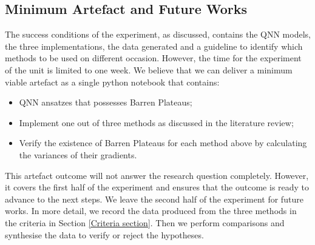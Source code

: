 \subsection{Minimum Artefact and Future Works}

The success conditions of the experiment, as discussed, contains the QNN models, the three implementations, the data generated and a guideline to identify which methods to be used on different occasion.
However, the time for the experiment of the unit is limited to one week. We believe that we can deliver a minimum viable artefact as a single python notebook that contains:
\begin{itemize}
    \item QNN ansatzes that possesses Barren Plateaus;
    \item Implement one out of three methods as discussed in the literature review;
    \item Verify the existence of Barren Plateaus for each method above by calculating the variances of their gradients.
\end{itemize}

This artefact outcome will not answer the research question completely.
However, it covers the first half of the experiment and ensures that the outcome is ready to advance to the next steps.
We leave the second half of the experiment for future works.
In more detail, we record the data produced from the three methods in the criteria in Section \ref{Criteria section}.
Then we perform comparisons and synthesise the data to verify or reject the hypotheses.
